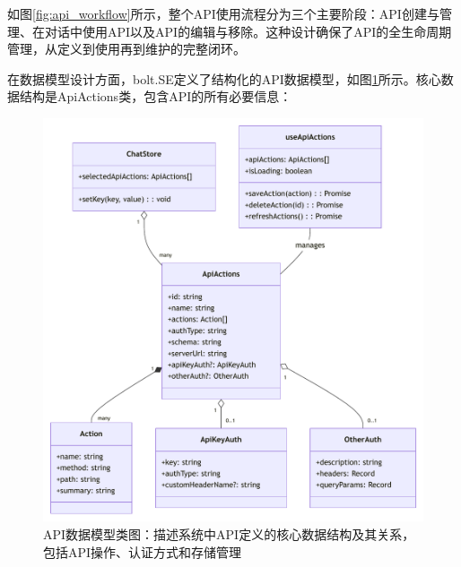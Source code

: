 如图\ref{fig:api_workflow}所示，整个API使用流程分为三个主要阶段：API创建与管理、在对话中使用API以及API的编辑与移除。这种设计确保了API的全生命周期管理，从定义到使用再到维护的完整闭环。

在数据模型设计方面，bolt.SE定义了结构化的API数据模型，如图\ref{fig:api_actions_class}所示。核心数据结构是ApiActions类，包含API的所有必要信息：

\begin{figure}[htbp]
  \centering
  \includegraphics[width=\textwidth]{figures/api_actions_class.pdf}
  \caption{API数据模型类图：描述系统中API定义的核心数据结构及其关系，包括API操作、认证方式和存储管理}
  \label{fig:api_actions_class}
\end{figure}


    
    
    

